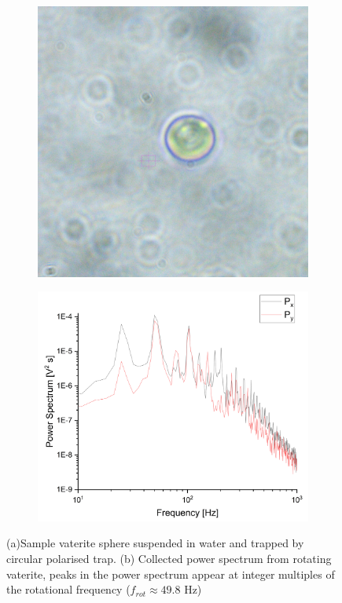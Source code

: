 \begin{figure}[h!]
	\centering
	\begin{subfigure}{0.4\linewidth}
		\includegraphics[width=\linewidth]{vaterite_sample.jpg}
		\subcaption{}
	\end{subfigure}
	\begin{subfigure}{0.55\linewidth}
		\includegraphics[width=\linewidth]{rotating_psd.png}
		\subcaption{}
	\end{subfigure}
	\caption{(a)Sample vaterite sphere suspended in water and trapped by circular polarised trap. (b) Collected power spectrum from rotating vaterite, peaks in the power spectrum appear at integer multiples of the rotational frequency ($f_{rot} \approx 49.8$ Hz)}
	\label{fig:vaterite}
\end{figure}

